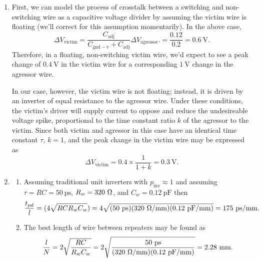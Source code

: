\documentclass{article}
\begin{document}
\begin{enumerate}[label=\thesubsection]
	\setcounter{subsection}{1}
	\item First, we can model the process of crosstalk between a switching and non-switching wire as a capacitive voltage divider by assuming the victim wire is floating (we'll correct for this assumption momentarily). In the above case, 
		\[
			\Delta V_{\mathrm{victim}} = \frac{C_{\mathrm{adj}}}{C_{\mathrm{gnd-v}} + C_{\mathrm{adj}}} \Delta V_{\mathrm{agressor}}. = \frac{0.12}{0.2} = 0.6 \ \mathrm{V}.
		\]
		Therefore, in a floating, non-switching victim wire, we'd expect to see a peak change of \(0.4 \ \mathrm{V}\) in the victim wire for a corresponding \(1 \ \mathrm{V}\) change in the agressor wire. 

		In our case, however, the victim wire is not floating; instead, it is driven by an inverter of equal resistance to the agressor wire. Under these conditions, the victim's driver will supply current to oppose and reduce the undesireable voltage spike, proportional to the time constant ratio \(k\) of the agressor to the victim. Since both victim and agressor in this case have an identical time constant \(\tau\), \(k=1\), and the peak change in the victim wire may be expressed as 
		\[
			\Delta V_{\mathrm{victim}} = 0.4 \times \frac{1}{1+k} = 0.3 \ \mathrm{V}.
		\]
	\setcounter{subsection}{2}
	\item 
		\begin{enumerate}[label=\arabic*.]
			\item Assuming traditional unit inverters with \(p_{\mathrm{inv}} \approx 1\) and assuming \(\tau = RC = 50 \ \mathrm{ps}\), \(R_w = 320 \ \ohm\), and \(C_w = 0.12 \ \mathrm{pF}\) then
					\[
						\frac{t_{pd}}{l} = (4\sqrt{RCR_wC_w}) = 4 \sqrt{(50 \ \mathrm{ps})(320 \ \ohm/\mathrm{mm})(0.12 \ \mathrm{pF/mm})} = 175 \ \mathrm{ps/mm}.
					\]
			\item The best length of wire between repeaters may be found as 
					\[
						\frac{l}{N} = 2\sqrt{\frac{RC}{R_w C_w}} = 2\sqrt{\frac{50 \ \mathrm{ps}}{(320 \ \ohm/\mathrm{mm})(0.12 \ \mathrm{pF/mm})}}=2.28 \ \mathrm{mm}.
					\]
		\end{enumerate}
\end{enumerate}
\end{document}

